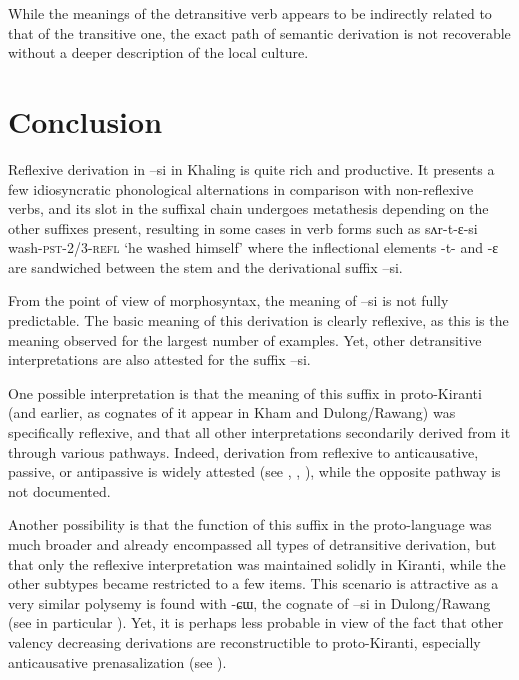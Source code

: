 \documentclass[twoside,a4paper,11pt]{article}
\newcommand{\ipa}[1]{{\phon#1}}
\begin{document}
While the meanings of the detransitive verb appears to be indirectly related to that of the transitive one, the exact path of semantic derivation is not recoverable without a deeper description of the local culture.

\section{Conclusion}
Reflexive derivation in \ipa{--si} in Khaling is quite rich and productive. It  presents a few idiosyncratic phonological alternations in comparison with non-reflexive verbs, and its slot in the suffixal chain undergoes metathesis depending on the other suffixes present,  resulting in some cases in verb forms such as \ipa{sʌr-t-ɛ-si} wash-\textsc{pst-2/3-refl} `he washed himself' where the inflectional elements \ipa{-t-} and \ipa{-ɛ} are sandwiched between the stem and the derivational suffix \ipa{--si}.

From the point of view of morphosyntax, the meaning of  \ipa{--si}  is not fully predictable. The basic meaning of this derivation is clearly reflexive, as this is the meaning observed for the largest number of examples. Yet, other detransitive interpretations are also attested for the suffix \ipa{--si}. 

One possible interpretation is that the meaning of this suffix in proto-Kiranti (and earlier, as cognates of it appear in Kham and Dulong/Rawang) was specifically reflexive, and that all other interpretations secondarily  derived from it through various pathways. Indeed, derivation from reflexive to anticausative, passive, or antipassive is widely attested (see \citealt{haspelmath90passive}, \citealt{nedjalkov07reciprocal}, \citealt{say09antipassive}), while the opposite pathway is not documented.


Another possibility is that the function of this suffix in the proto-language was much broader and already encompassed all types of detransitive  derivation, but that only the reflexive interpretation was maintained solidly in Kiranti, while the other subtypes became restricted to a few items. This scenario is attractive as a very similar polysemy is found with \ipa{-ɕɯ}, the cognate of \ipa{--si} in Dulong/Rawang (see in particular \citealt{lapolla05reflexive}). Yet, it is perhaps less probable in view of the fact that other valency decreasing derivations are reconstructible to proto-Kiranti, especially  anticausative prenasalization (see \citealt{jacques13derivational.khaling}). 
\end{document}
